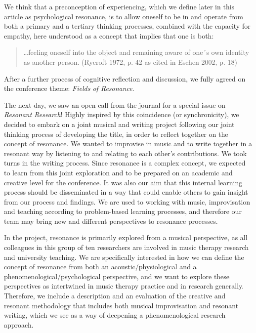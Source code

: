 \begin{adjmulticols}{2}{0mm}{0mm}
We think that a preconception of experiencing, which we define later in this article as psychological resonance, is to allow oneself to be in and operate from both a primary and a tertiary thinking processes, combined with the capacity for empathy, here understood as a concept that implies that one is both:
    \blockquote{…feeling oneself into the object and remaining aware of one´s own identity as another person. (Rycroft 1972, p. 42 as cited in Eschen 2002, p. 18)}
After a further process of cognitive reflection and discussion, we fully agreed on the conference theme: \textit{Fields of Resonance}.%
\par
The next day, we saw an open call from the journal \textit{\theJournal{}} for a special issue on \textit{Resonant Research}! Highly inspired by this coincidence (or synchronicity), we decided to embark on a joint musical and writing project following our joint thinking process of developing the title, in order to reflect together on the concept of resonance. We wanted to improvise in music and to write together in a resonant way by listening to and relating to each other’s contributions. We took turns in the writing process. Since resonance is a complex concept, we expected to learn from this joint exploration and to be prepared on an academic and creative level for the conference. It was also our aim that this internal learning process should be disseminated in a way that could enable others to gain insight from our process and findings. We are used to working with music, improvisation and teaching according to problem-based learning processes, and therefore our team may bring new and different perspectives to resonance processes. 

In the project, resonance is primarily explored from a musical perspective, as all colleagues in this group of ten researchers are involved in music therapy research and university teaching.%
We are specifically interested in how we can define the concept of resonance from both an acoustic/physiological and a phenomenological/psychological perspective, and we want to explore these perspectives as intertwined in music therapy practice and in research generally. Therefore, we include a description and an evaluation of the creative and resonant methodology that includes both musical improvisation and resonant writing, which we see as a way of deepening a phenomenological research approach.


\end{adjmulticols}

